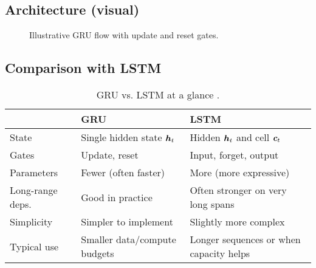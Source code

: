 \subsection{Architecture (visual)}
\begin{figure}[h]
    \centering
    \caption{Illustrative GRU flow with update and reset gates.}
\end{figure}

\subsection{Comparison with LSTM}
\begin{table}[h]
    \centering
    \begin{tabular}{@{}p{3.2cm}p{5.2cm}p{5.2cm}@{}}
    \toprule
    & \textbf{GRU} & \textbf{LSTM} \\
    \midrule
    State & Single hidden state $\boldsymbol{h}_t$ & Hidden $\boldsymbol{h}_t$ and cell $\boldsymbol{c}_t$ \\
    Gates & Update, reset & Input, forget, output \\
    Parameters & Fewer (often faster) & More (more expressive) \\
    Long-range deps. & Good in practice & Often stronger on very long spans \\
    Simplicity & Simpler to implement & Slightly more complex \\
    Typical use & Smaller data/compute budgets & Longer sequences or when capacity helps \\
    \bottomrule
    \end{tabular}
    \caption{GRU vs. LSTM at a glance \cite{Cho2014,Hochreiter1997,GoodfellowEtAl2016}.}
\end{table}

